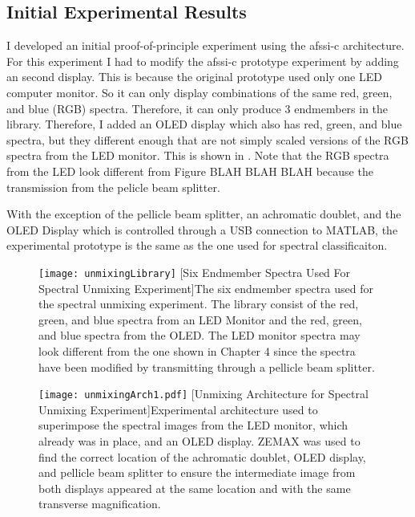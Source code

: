 \subsection{Initial Experimental Results}

I developed an initial proof-of-principle experiment using the \gls{afssi-c} architecture. For this experiment I had to modify the \gls{afssi-c} prototype experiment by adding an second display. This is because the original prototype used only one LED computer monitor. So it can only display combinations of the same red, green, and blue (RGB) spectra. Therefore, it can only produce 3 endmembers in the library. Therefore, I added an OLED display which also has red, green, and blue spectra, but they different enough that are not simply scaled versions of the RGB spectra from the LED monitor. This is shown in . Note that the RGB spectra from the LED look different from Figure BLAH BLAH BLAH because the transmission from the pelicle beam splitter. 

With the exception of the pellicle beam splitter, an achromatic doublet, and the OLED Display which is controlled through a USB connection to MATLAB, the experimental prototype is the same as the one used for spectral classificaiton. 

\begin{figure}
	\centering
	\texttt{[image: unmixingLibrary]}
	[Six Endmember Spectra Used For Spectral Unmixing Experiment]{The six endmember spectra used for the spectral unmixing experiment. The library consist of the red, green, and blue spectra from an LED Monitor and the red, green, and blue spectra from the OLED. The LED monitor spectra may look different from the one shown in Chapter 4 since the spectra have been modified by transmitting through a pellicle beam splitter. }
	\label{fig:unmixingLibrary}
\end{figure}

\begin{figure}
	\centering
	\texttt{[image: unmixingArch1.pdf]}
	[Unmixing Architecture for Spectral Unmixing Experiment]{Experimental architecture used to superimpose the spectral images from the LED monitor, which already was in place, and an OLED display. ZEMAX was used to find the correct location of the achromatic doublet, OLED display, and pellicle beam splitter to ensure the intermediate image from both displays appeared at the same location and with the same transverse magnification.}
	\label{fig:unmixingArch1}
\end{figure}

